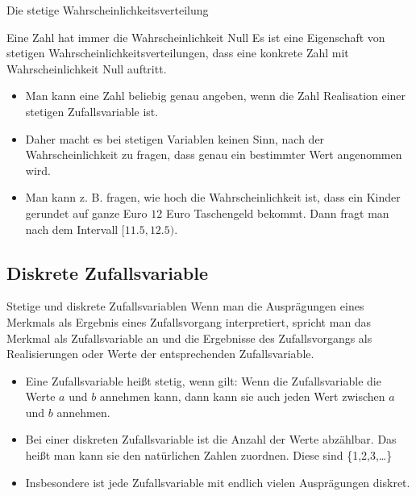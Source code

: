 \documentclass[usenames,dvipsnames,handout]{beamer}
\begin{document}
\begin{frame}{Die stetige Wahrscheinlichkeitsverteilung}
\begin{block}{Eine Zahl hat immer die Wahrscheinlichkeit Null}
Es ist eine Eigenschaft von stetigen Wahrscheinlichkeitsverteilungen, dass eine konkrete Zahl mit
Wahrscheinlichkeit Null auftritt.
\end{block}
\begin{itemize}
\item{Man kann eine Zahl beliebig genau angeben, wenn die Zahl Realisation einer stetigen Zufallsvariable ist.}\pause
\item{Daher macht es  bei stetigen Variablen keinen Sinn, nach der Wahrscheinlichkeit zu fragen, dass genau
ein bestimmter Wert angenommen wird.}\pause
\item{Man kann z. B. fragen, wie hoch die Wahrscheinlichkeit ist, dass ein Kinder gerundet auf ganze Euro $12$
Euro Taschengeld bekommt. Dann fragt man nach dem Intervall $[11.5,12.5).$}
\end{itemize}
\end{frame}


\subsection{Diskrete Zufallsvariable}

\begin{frame}{Stetige und diskrete Zufallsvariablen}%
Wenn man die Ausprägungen eines Merkmals als Ergebnis eines Zufallsvorgang interpretiert,
spricht man das Merkmal als Zufallsvariable an und die Ergebnisse des Zufallsvorgangs als Realisierungen
oder Werte
der entsprechenden Zufallsvariable.
\begin{itemize}
\item{Eine Zufallsvariable heißt stetig, wenn gilt: Wenn die Zufallsvariable die Werte $a$ und $b$ annehmen kann,
dann kann sie auch jeden Wert zwischen $a$ und $b$ annehmen.}\pause
\item{Bei einer diskreten Zufallsvariable ist die Anzahl der Werte abzählbar. Das heißt man kann sie den natürlichen Zahlen
zuordnen. Diese sind \{1,2,3,\dots\}}\pause
\item{Insbesondere ist jede Zufallsvariable mit endlich vielen Ausprägungen diskret.}
\end{itemize}
\end{frame}
\end{document}
